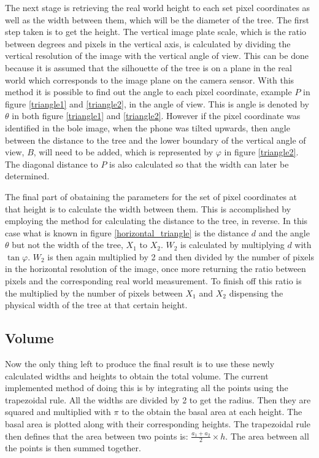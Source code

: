 The next stage is retrieving the real world height to each set pixel coordinates as well as the width between them, which will be the diameter of the tree. The first step taken is to get the height. The vertical image plate scale, which is the ratio between degrees and pixels in the vertical axis, is calculated by dividing the vertical resolution of the image with the vertical angle of view. This can be done because it is assumed that the silhouette of the tree is on a plane in the real world which corresponds to the image plane on the camera sensor. With this method it is possible to find out the angle to each pixel coordinate, example $P$ in figure \ref{triangle1} and \ref{triangle2}, in the angle of view. This is angle is denoted by $\theta$ in both figure \ref{triangle1} and \ref{triangle2}. However if the pixel coordinate was identified in the bole image, when the phone was tilted upwards, then angle between the distance to the tree and the lower boundary of the vertical angle of view, $B$, will need to be added, which is represented by $\varphi$ in figure \ref{triangle2}. The diagonal distance to $P$ is also calculated so that the width can later be determined.

The final part of obataining the parameters for the set of pixel coordinates at that height is to calculate the width between them. This is accomplished by employing the method for calculating the distance to the tree, in reverse. In this case what is known in figure \ref{horizontal_triangle} is the distance $d$ and the angle $\theta$ but not the width of the tree, $X_1$ to $X_2$. $W_2$ is calculated by multiplying $d$ with $\tan{\varphi}$. $W_2$ is then again multiplied by 2 and then divided by the number of pixels in the horizontal resolution of the image, once more returning the ratio between pixels and the corresponding real world measurement. To finish off this ratio is the multiplied by the number of pixels between $X_1$ and $X_2$ dispensing the physical width of the tree at that certain height.


\subsection{Volume}
Now the only thing left to produce the final result is to use these newly calculated widths and heights to obtain the total volume. The current implemented method of doing this is by integrating all the points using the trapezoidal rule. All the widths are divided by 2 to get the radius. Then they are squared and multiplied with $\pi$ to the obtain the basal area at each height. The basal area is plotted along with their corresponding heights. The trapezoidal rule then defines that the area between two points is: $\frac{a_1 + a_2}{2} \times h$. The area between all the points is then summed together.


